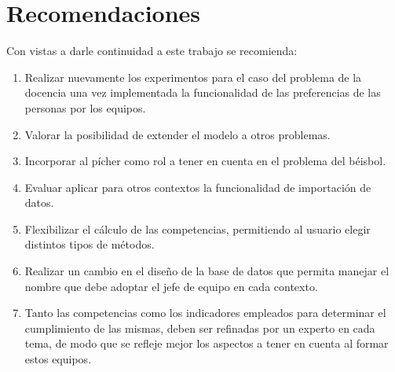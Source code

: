 \chapter*{Recomendaciones}
Con vistas a darle continuidad a este trabajo se recomienda: 
\begin{enumerate}
	\item Realizar nuevamente los experimentos para el caso del problema de la docencia una vez implementada la funcionalidad de las preferencias de las personas por los equipos.
	\item Valorar la posibilidad de extender el modelo a otros problemas.
	\item Incorporar al pícher como rol a tener en cuenta en el problema del béisbol.
	\item Evaluar aplicar para otros contextos la funcionalidad de importación de datos.
	\item Flexibilizar el cálculo de las competencias, permitiendo al usuario elegir distintos tipos de métodos.
	\item Realizar un cambio en el diseño de la base de datos que permita manejar el nombre que debe adoptar el jefe de equipo en cada contexto.
	\item Tanto las competencias como los indicadores empleados para determinar el cumplimiento de las mismas, deben ser refinadas por un experto en cada tema, de modo que se refleje mejor los aspectos a tener en cuenta al formar estos equipos.
\end{enumerate}